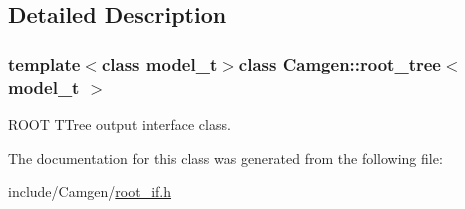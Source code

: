 \subsection{Detailed Description}
\subsubsection*{template$<$class model\-\_\-t$>$class Camgen\-::root\-\_\-tree$<$ model\-\_\-t $>$}

R\-O\-O\-T T\-Tree output interface class. 

The documentation for this class was generated from the following file\-:\begin{DoxyCompactItemize}
\item 
include/\-Camgen/\hyperlink{a00732}{root\-\_\-if.\-h}\end{DoxyCompactItemize}
